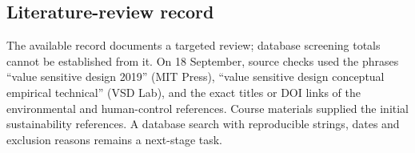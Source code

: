 \subsection*{Literature-review record}
The available record documents a targeted review; database screening totals cannot be established from it. On 18 September, source checks used the phrases ``value sensitive design 2019'' (MIT Press), ``value sensitive design conceptual empirical technical'' (VSD Lab), and the exact titles or DOI links of the environmental and human-control references. Course materials supplied the initial sustainability references. A database search with reproducible strings, dates and exclusion reasons remains a next-stage task.
